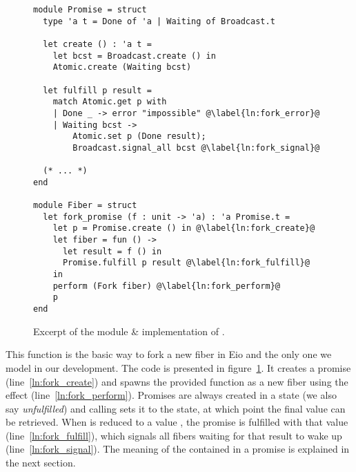 \begin{figure}[ht]
  \begin{verbatim}
module Promise = struct
  type 'a t = Done of 'a | Waiting of Broadcast.t

  let create () : 'a t = 
    let bcst = Broadcast.create () in
    Atomic.create (Waiting bcst)

  let fulfill p result =
    match Atomic.get p with
    | Done _ -> error "impossible" @\label{ln:fork_error}@
    | Waiting bcst ->
        Atomic.set p (Done result);
        Broadcast.signal_all bcst @\label{ln:fork_signal}@

  (* ... *)
end
  
module Fiber = struct
  let fork_promise (f : unit -> 'a) : 'a Promise.t =
    let p = Promise.create () in @\label{ln:fork_create}@
    let fiber = fun () ->
      let result = f () in
      Promise.fulfill p result @\label{ln:fork_fulfill}@
    in
    perform (Fork fiber) @\label{ln:fork_perform}@
    p
end
  \end{verbatim}
  \caption{Excerpt of the  module \& implementation of .}
  \label{fig:sched-impl-fork}
\end{figure}

This function is the basic way to fork a new fiber in Eio and the only one we model in our development.
The code is presented in figure~\ref{fig:sched-impl-fork}.
It creates a promise (line~\ref{ln:fork_create}) and spawns the provided function as a new fiber using the \efork{} effect (line~\ref{ln:fork_perform}).
Promises are always created in a  state (we also say \emph{unfulfilled}) and calling  sets it to the  state, at which point the final value can be retrieved.
When  is reduced to a value , the promise is fulfilled with that value (line~\ref{ln:fork_fulfill}), which signals all fibers waiting for that result to wake up (line~\ref{ln:fork_signal}).
The meaning of the  contained in a promise is explained in the next section.

\subsubsection{}
\label{sec:sched-impl-await}

